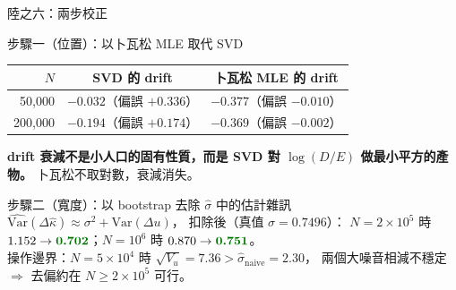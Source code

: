 \documentclass[aspectratio=169, UTF8, fontset=macnew, 11pt]{ctexbeamer}
\newcommand{\hi}[1]{\textcolor{red!70!black}{\textbf{#1}}}
\newcommand{\gd}[1]{\textcolor{green!45!black}{\textbf{#1}}}
\begin{document}
\begin{frame}{陸之六：兩步校正}
\begin{block}{步驟一（位置）：以卜瓦松 MLE 取代 SVD}
\small
\begin{center}
\begin{tabular}{rcc}
\toprule
$N$ & SVD 的 drift & 卜瓦松 MLE 的 drift\\
\midrule
50,000 & $-0.032$（偏誤 \hi{$+0.336$}） & \gd{$-0.377$}（偏誤 $-0.010$）\\
200,000 & $-0.194$（偏誤 \hi{$+0.174$}） & \gd{$-0.369$}（偏誤 $-0.002$）\\
\bottomrule
\end{tabular}
\end{center}
\vspace{2pt}
\hi{drift 衰減不是小人口的固有性質，而是 SVD 對 $\log(D/E)$ 做最小平方的產物。}
卜瓦松不取對數，衰減消失。
\end{block}
\begin{block}{步驟二（寬度）：以 bootstrap 去除 $\hat\sigma$ 中的估計雜訊}
\small
$\widehat{\text{Var}}(\Delta\hat\kappa)\approx\sigma^2+\text{Var}(\Delta u)$，
扣除後（真值 $\sigma=0.7496$）：
$N=2\times10^5$ 時 $1.152\to\gd{0.702}$；$N=10^6$ 時 $0.870\to\gd{0.751}$。\\
\footnotesize 操作邊界：$N=5\times10^4$ 時 $\sqrt{V_u}=7.36>\hat\sigma_{\text{naive}}=2.30$，
兩個大噪音相減不穩定 $\Rightarrow$ 去偏約在 $N\ge2\times10^5$ 可行。
\end{block}
\end{frame}
\end{document}
